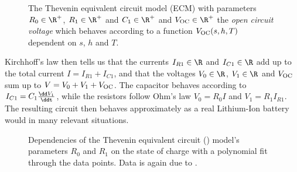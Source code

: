 \documentclass{prettytex/ox/mmsc-special-topic}
\begin{document}
  \begin{figure}[H]
    \centering
    \caption{
      The Thevenin equivalent circuit model (ECM) with parameters $R_0 \in \R^+$, $R_1 \in \R^+$ and $C_1 \in \R^+$ and $V_{\rm OC} \in \R^+$ the \textit{open circuit voltage} which behaves according to a function $V_{\rm OC}(s, h, T)$ dependent on $s$, $h$ and $T$.
    }
    \label{fig:ecm}
  \end{figure}

  Kirchhoff's law then tells us that the currents $I_{R1} \in \R$ and $I_{C1} \in \R$ add up to the total current $I = I_{R1} + I_{C1}$, and that the voltages $V_0 \in \R$, $V_1 \in \R$ and $V_{\rm OC}$ sum up to $V = V_0 + V_1 + V_{\rm OC}$.
  The capacitor behaves according to $I_{C1} = C_1 \frac{\dd V_1}{\ddt}$, while the resistors follow Ohm's law $V_0 = R_0 I$ and $V_1 = R_1 I_{R1}$.
  The resulting circuit then behaves approximately as a real Lithium-Ion battery would in many relevant situations.

  \begin{figure}[H]
    \captionsetup[subfigure]{justification=centering}
    \centering
    \hfill
    \par
    \caption{Dependencies of the Thevenin equivalent circuit () model's parameters $R_0$ and $R_1$ on the state of charge with a polynomial fit through the data points. Data is again due to \cite{panasonicnums}.}
    \label{fig:parameters}
  \end{figure}
\end{document}
